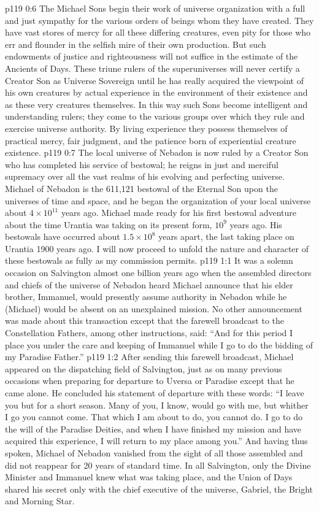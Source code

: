 \vs p119 0:6 The Michael Sons begin their work of universe organization with a full and just sympathy for the various orders of beings whom they have created. They have vast stores of mercy for all these differing creatures, even pity for those who err and flounder in the selfish mire of their own production. But such endowments of justice and righteousness will not suffice in the estimate of the Ancients of Days. These triune rulers of the superuniverses will never certify a Creator Son as Universe Sovereign until he has really acquired the viewpoint of his own creatures by actual experience in the environment of their existence and as these very creatures themselves. In this way such Sons become intelligent and understanding rulers; they come to  the various groups over which they rule and exercise universe authority. By living experience they possess themselves of practical mercy, fair judgment, and the patience born of experiential creature existence.
\vs p119 0:7 \pc The local universe of Nebadon is now ruled by a Creator Son who has completed his service of bestowal; he reigns in just and merciful supremacy over all the vast realms of his evolving and perfecting universe. Michael of Nebadon is the 611,121 bestowal of the Eternal Son upon the universes of time and space, and he began the organization of your local universe about $4\times 10^{11}$ years ago. Michael made ready for his first bestowal adventure about the time Urantia was taking on its present form, $10^9$ years ago. His bestowals have occurred about $1.5\times 10^8$ years apart, the last taking place on Urantia 1900 years ago. I will now proceed to unfold the nature and character of these bestowals as fully as my commission permits.
\vs p119 1:1 It was a solemn occasion on Salvington almost one billion years ago when the assembled directors and chiefs of the universe of Nebadon heard Michael announce that his elder brother, Immanuel, would presently assume authority in Nebadon while he (Michael) would be absent on an unexplained mission. No other announcement was made about this transaction except that the farewell broadcast to the Constellation Fathers, among other instructions, said: “And for this period I place you under the care and keeping of Immanuel while I go to do the bidding of my Paradise Father.”
\vs p119 1:2 After sending this farewell broadcast, Michael appeared on the dispatching field of Salvington, just as on many previous occasions when preparing for departure to Uversa or Paradise except that he came alone. He concluded his statement of departure with these words: “I leave you but for a short season. Many of you, I know, would go with me, but whither I go you cannot come. That which I am about to do, you cannot do. I go to do the will of the Paradise Deities, and when I have finished my mission and have acquired this experience, I will return to my place among you.” And having thus spoken, Michael of Nebadon vanished from the sight of all those assembled and did not reappear for 20 years of standard time. In all Salvington, only the Divine Minister and Immanuel knew what was taking place, and the Union of Days shared his secret only with the chief executive of the universe, Gabriel, the Bright and Morning Star.
